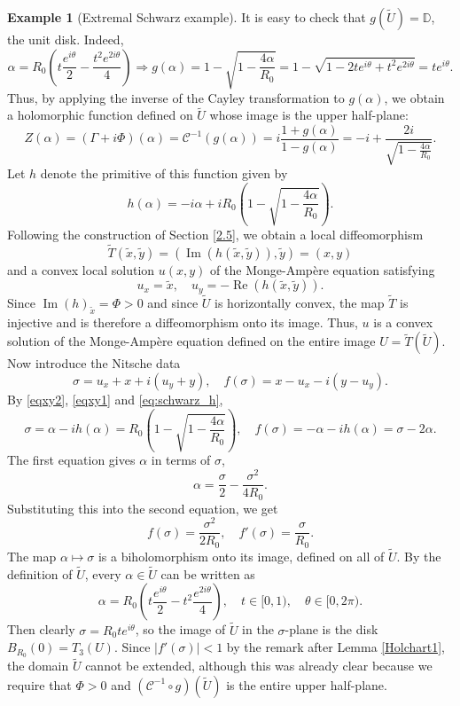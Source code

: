 \documentclass[11pt,reqno]{amsart}
\theoremstyle{plain}
\theoremstyle{definition}
\newtheorem{example}[theorem]{Example}
\numberwithin{equation}{section}
\begin{document}
\begin{example}[Extremal Schwarz example]
\noindent It is easy to check that $g(\widetilde{U}) = \mathbb{D}$, the unit disk. Indeed,
$$\alpha=R_0\left(t\frac{e^{i\theta}}{2}-\frac{t^2e^{2i\theta}}{4}\right)  \Longrightarrow  g(\alpha) =  1-\sqrt{1-\frac{4\alpha}{R_0}}= 1-\sqrt{1-2te^{i\theta}+t^2e^{2i\theta}}= te^{i\theta}.
$$
Thus, by applying the inverse of the Cayley transformation to $g(\alpha)$, we obtain a holomorphic function defined on $\widetilde{U}$ whose image is the upper half-plane:
\begin{equation}\label{holschw}
Z(\alpha) = (\Gamma + i\Phi)(\alpha) = \mathscr{C}^{-1}(g(\alpha))= i\frac{1+g(\alpha)}{1-g(\alpha)}=-i+\frac{2i}{\sqrt{1-\frac{4\alpha}{R_0}}}.
\end{equation}
Let $h$ denote the primitive of this function given by
\begin{equation}\label{eq:schwarz_h} h(\alpha)=-i\alpha+iR_0\left(1-\sqrt{1-\frac{4\alpha}{R_0}}\right).\end{equation}
Following the construction of Section \ref{2.5}, we obtain a local diffeomorphism 
\begin{equation}\label{eqxy1}
\widetilde T(\tilde{x},\tilde{y})=\left(\operatorname{Im}(h(\tilde{x},\tilde{y})),\tilde{y}\right)=(x,y)
\end{equation}
and a convex local solution $u(x,y)$ of the Monge-Ampère equation satisfying
\begin{equation}\label{eqxy2}
   u_x=\tilde{x}, \quad u_y=-{\operatorname{Re}(h(\tilde{x},\tilde{y}))}.
\end{equation}
Since $\operatorname{Im}(h)_{\tilde{x}}=\Phi>0$ and since $\widetilde U$ is horizontally convex, the map $\widetilde{T}$ is injective and is therefore a diffeomorphism onto its image. Thus, $u$ is a convex solution of the Monge-Ampère equation defined on the entire image $U = \widetilde{T}(\widetilde{U})$.
Now introduce the Nitsche data
$$\sigma=u_x+x+i(u_y+y), \quad f(\sigma)=x-u_x-i(y-u_y).$$
By \eqref{eqxy2}, \eqref{eqxy1} and \eqref{eq:schwarz_h},
$$
\sigma  =  \alpha-ih(\alpha) = R_0\left(1 -\sqrt{1-\frac{4\alpha}{R_0}}\right), \quad
f(\sigma)  =  -\alpha-ih(\alpha) = \sigma - 2\alpha.
$$
The first equation gives $\alpha$ in terms of $\sigma$,
\begin{equation}\label{alphasig}
\alpha=\frac{\sigma}{2}-\frac{\sigma^2}{4R_0}.
\end{equation}
Substituting this into the second equation, we get
$$f(\sigma)= \frac{\sigma^2}{2R_0}, \quad f'(\sigma)=\frac{\sigma}{R_0}.$$ 
The map $\alpha \mapsto \sigma$ is a biholomorphism onto its image, defined on all of $\widetilde{U}$. By the definition of $\widetilde{U}$, every $\alpha \in \widetilde{U}$ can be written as
$$\alpha=R_0\left(t\frac{e^{i\theta}}{2}-t^2\frac{e^{2i\theta}}{4}\right), \quad t \in [0,1), \quad \theta \in [0,2\pi).$$
Then clearly $\sigma=R_0 te^{i\theta}$, so the image of $\widetilde{U}$ in the $\sigma$-plane is the disk $B_{R_0}(0) = T_3(U)$. Since $|f'(\sigma)| < 1$ by the remark after Lemma \ref{Holchart1}, the domain $\widetilde{U}$ cannot be extended, although this was already clear because we require that $\Phi >0$ and $(\mathscr{C}^{-1} \circ g)(\widetilde{U})$ is the entire upper half-plane.


\end{example}
\end{document}

